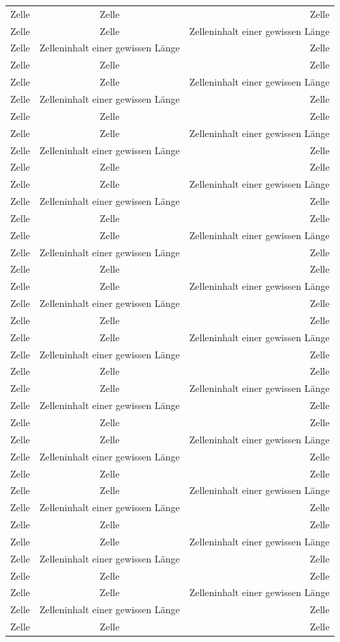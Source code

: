 \documentclass[ngerman]{scrartcl}
\begin{document}
\begin{longtabu}[l]{@{}lcr@{}}
		Zelle & Zelle & Zelle\\
		Zelle & Zelle & Zelleninhalt einer gewissen Länge\\
		Zelle & Zelleninhalt einer gewissen Länge & Zelle\\
		Zelle & Zelle & Zelle\\
		Zelle & Zelle & Zelleninhalt einer gewissen Länge\\
		Zelle & Zelleninhalt einer gewissen Länge & Zelle\\
		Zelle & Zelle & Zelle\\
		Zelle & Zelle & Zelleninhalt einer gewissen Länge\\
		Zelle & Zelleninhalt einer gewissen Länge & Zelle\\
		Zelle & Zelle & Zelle\\
		Zelle & Zelle & Zelleninhalt einer gewissen Länge\\
		Zelle & Zelleninhalt einer gewissen Länge & Zelle\\
		Zelle & Zelle & Zelle\\
		Zelle & Zelle & Zelleninhalt einer gewissen Länge\\
		Zelle & Zelleninhalt einer gewissen Länge & Zelle\\
		Zelle & Zelle & Zelle\\
		Zelle & Zelle & Zelleninhalt einer gewissen Länge\\
		Zelle & Zelleninhalt einer gewissen Länge & Zelle\\
		Zelle & Zelle & Zelle\\
		Zelle & Zelle & Zelleninhalt einer gewissen Länge\\
		Zelle & Zelleninhalt einer gewissen Länge & Zelle\\
		Zelle & Zelle & Zelle\\
		Zelle & Zelle & Zelleninhalt einer gewissen Länge\\
		Zelle & Zelleninhalt einer gewissen Länge & Zelle\\
		Zelle & Zelle & Zelle\\
		Zelle & Zelle & Zelleninhalt einer gewissen Länge\\
		Zelle & Zelleninhalt einer gewissen Länge & Zelle\\
		Zelle & Zelle & Zelle\\
		Zelle & Zelle & Zelleninhalt einer gewissen Länge\\
		Zelle & Zelleninhalt einer gewissen Länge & Zelle\\
		Zelle & Zelle & Zelle\\
		Zelle & Zelle & Zelleninhalt einer gewissen Länge\\
		Zelle & Zelleninhalt einer gewissen Länge & Zelle\\
		Zelle & Zelle & Zelle\\
		Zelle & Zelle & Zelleninhalt einer gewissen Länge\\
		Zelle & Zelleninhalt einer gewissen Länge & Zelle\\
		Zelle & Zelle & Zelle\\
		\bottomrule
	\end{longtabu}
\end{document}
